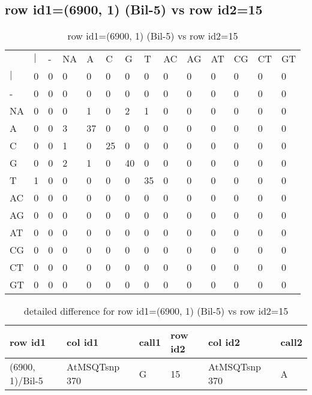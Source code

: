 \subsection{row id1=(6900, 1) (Bil-5) vs row id2=15}
\begin{center}
\begin{longtable}{|l|l|l|l|l|l|l|l|l|l|l|l|l|l|}
\caption{row id1=(6900, 1) (Bil-5) vs row id2=15} \label{table_dm62}\\
\hline
\\
\hline
&$|$&-&NA&A&C&G&T&AC&AG&AT&CG&CT&GT\\
$|$&0&0&0&0&0&0&0&0&0&0&0&0&0\\
-&0&0&0&0&0&0&0&0&0&0&0&0&0\\
NA&0&0&0&1&0&2&1&0&0&0&0&0&0\\
A&0&0&3&37&0&0&0&0&0&0&0&0&0\\
C&0&0&1&0&25&0&0&0&0&0&0&0&0\\
G&0&0&2&1&0&40&0&0&0&0&0&0&0\\
T&1&0&0&0&0&0&35&0&0&0&0&0&0\\
AC&0&0&0&0&0&0&0&0&0&0&0&0&0\\
AG&0&0&0&0&0&0&0&0&0&0&0&0&0\\
AT&0&0&0&0&0&0&0&0&0&0&0&0&0\\
CG&0&0&0&0&0&0&0&0&0&0&0&0&0\\
CT&0&0&0&0&0&0&0&0&0&0&0&0&0\\
GT&0&0&0&0&0&0&0&0&0&0&0&0&0\\
\hline
\end{longtable}
\end{center}

\begin{center}
\begin{longtable}{|l|l|l|l|l|l|}
\caption{detailed difference for row id1=(6900, 1) (Bil-5) vs row id2=15} \label{table_dm63}\\
\hline
row id1&col id1&call1&row id2&col id2&call2\\
\hline
(6900, 1)/Bil-5&AtMSQTsnp 370&G&15&AtMSQTsnp 370&A\\
\hline
\end{longtable}
\end{center}

